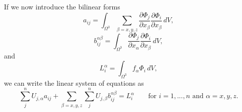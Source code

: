 \documentclass[oneside,a4paper,11pt]{report}
\begin{document}
If we now introduce the bilinear forms 
\begin{equation}
    a_{ij} = \int_{\Omega^3} \sum_{\beta=x,y,z} \frac{\partial \Phi_j}{\partial x_\beta} \frac{\partial \Phi_i}{\partial x_\beta} \,dV,
\end{equation}
\begin{equation}
    b_{ij}^{\alpha \beta} = \int_{\Omega^3}\frac{\partial \Phi_j}{\partial x_\alpha} \frac{\partial \Phi_i}{\partial x_\beta} \, dV,
\end{equation}
and
\begin{equation}
    L_i^\alpha = \int_{\Omega^3} f_\alpha \Phi_i \,dV,
\end{equation}
we can write the linear system of equations as
\begin{equation}
    \sum_j^n U_{j,\alpha} a_{ij} + \sum_{\beta=x,y,z} \sum_j^n U_{j,\beta} b_{ij}^{\alpha \beta} = L_i^\alpha \qquad \text{for } i = 1,...,n \text{ and } \alpha = x,y,z.
\end{equation}

\end{document}

